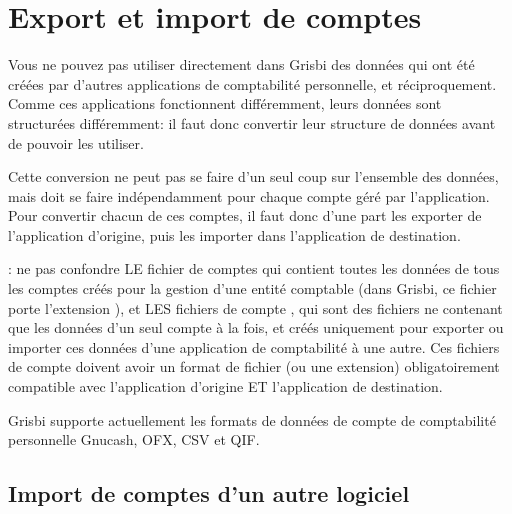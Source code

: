 

\chapter{Export et import de comptes\label{move}}

Vous ne pouvez pas utiliser directement dans Grisbi des données qui ont été créées par d'autres applications de comptabilité personnelle, et réciproquement. Comme ces applications fonctionnent différemment, leurs données sont structurées différemment: il faut donc convertir leur structure de données avant de pouvoir les utiliser. 

Cette conversion ne peut pas se faire d'un seul coup sur l'ensemble des données, mais doit se faire indépendamment pour chaque compte géré par l'application. Pour convertir chacun de ces comptes, il faut donc d'une part les \og exporter \fg{} de l'application d'origine, puis les \og importer \fg{} dans l'application de destination.


 : ne pas confondre LE \og fichier de comptes \fg{} qui contient toutes les données de tous les comptes créés pour la gestion d'une entité comptable (dans Grisbi, ce fichier porte l'\gls{extension} ), et LES \og fichiers de compte \fg{}, qui sont des fichiers ne contenant que les données d'un seul compte à la fois, et créés uniquement pour exporter ou importer ces données d'une application de comptabilité à une autre. Ces \og fichiers de compte \fg{} doivent avoir un \gls{format de fichier} (ou une extension) obligatoirement compatible avec l'application d'origine ET l'application de destination.

Grisbi supporte actuellement les formats de données de compte de comptabilité personnelle \gls{Gnucash}, \gls{OFX}, \gls{CSV} et \gls{QIF}.


\section{Import de comptes d'un autre logiciel\label{move-import}}


